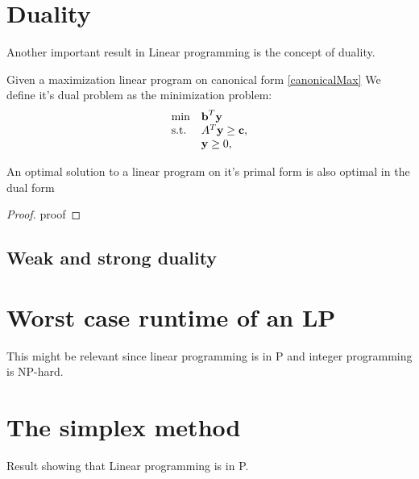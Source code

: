 \section{Duality}
Another important result in Linear programming is the concept of duality.
\begin{definition}
Given a maximization linear program on canonical form \ref{canonicalMax}
We define it's dual problem as the minimization problem:
\begin{align}\label{canonicalMaxDual}
\begin{array}{ll@{}ll}
\text{min} &\textbf{b}^T\textbf{y}&\\
\text{s.t.} &A^T\textbf{y} \geq \textbf{c},&\\
&\textbf{y} \geq 0,&\\
\end{array}
\end{align}
\end{definition}
\begin{theorem}
An optimal solution to a linear program on it's primal form is also optimal in the dual form
\begin{proof}
proof
\end{proof}
\end{theorem}
\subsection{Weak and strong duality}
\section{Worst case runtime of an LP}
This might be relevant since linear programming is in P and integer programming is NP-hard.
\section{The simplex method}
Result showing that Linear programming is in P.

\iffalse
